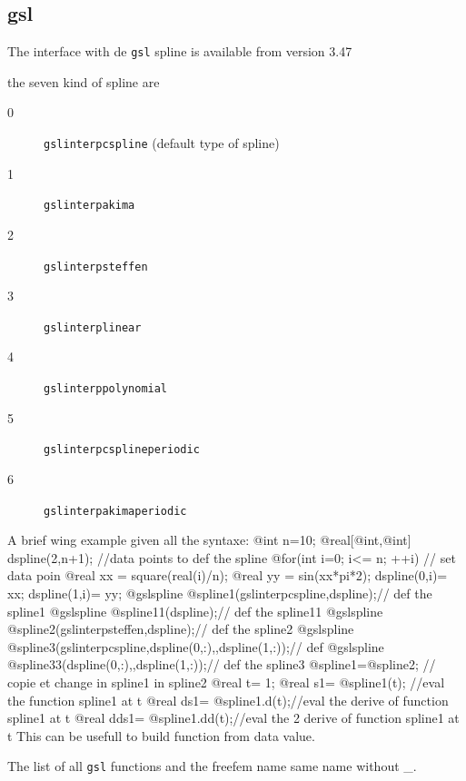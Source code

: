 \documentclass[a4paper,twoside,12pt]{book}
\begin{document}
\subsection{gsl}
\label{section:gsl}
{The interface with de \texttt{gsl} spline is available from version 3.47

the seven kind of spline are 
\begin{description}
\item[0 ] \texttt{gslinterpcspline} (default type of spline)
\item[1 ] \texttt{gslinterpakima}
\item[2 ] \texttt{gslinterpsteffen}
\item[3 ] \texttt{gslinterplinear}
\item[4 ]  \texttt{gslinterppolynomial}
\item[5 ] \texttt{gslinterpcsplineperiodic}
\item[6 ]  \texttt{gslinterpakimaperiodic} 
\end{description}
A brief wing example given all the syntaxe: 
\bFF
 @int n=10;
 @real[@int,@int] dspline(2,n+1); //data points to def the spline  
 @for(int i=0; i<= n; ++i) // set data poin 
  {
    @real xx = square(real(i)/n); 
    @real yy = sin(xx*pi*2); 
    dspline(0,i)= xx;
    dspline(1,i)= yy;    
  }
  @gslspline @spline1(gslinterpcspline,dspline);// def the spline1 
  @gslspline @spline11(dspline);// def the spline11
  @gslspline @spline2(gslinterpsteffen,dspline);// def the spline2
  @gslspline @spline3(gslinterpcspline,dspline(0,:),,dspline(1,:));// def 
  @gslspline @spline33(dspline(0,:),,dspline(1,:));// def the spline3
  @spline1=@spline2; // copie et change in  spline1 in  spline2
  @real t= 1; 
  @real s1= @spline1(t); //eval the function spline1 at   t 
  @real ds1= @spline1.d(t);//eval the derive of function spline1 at  t 
  @real dds1= @spline1.dd(t);//eval the 2 derive of function spline1 at t 
\eFF
This can be usefull to build  function  from data value.
}

\bigskip
The list of all \texttt{gsl} functions and the freefem name same name  without \_.  
\end{document}
